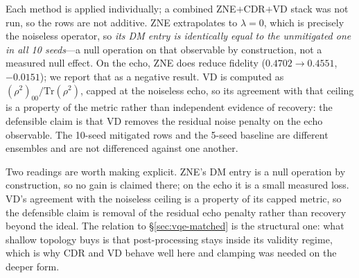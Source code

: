 \documentclass[twocolumn,aps,prl,superscriptaddress,showkeys]{revtex4-2}
\theoremstyle{plain}
\theoremstyle{definition}
\newcommand{\fakefez}{\texttt{FakeFez}}
\begin{document}
\begin{table}[htbp]
\centering
\caption{8-qubit mitigation on \fakefez{} over a complete ten-seed ensemble, mean$\pm$s.d. ($\mathrm{ddof}=1$), no seed excluded. DM: density-matrix fidelity under the target noise model. Echo: inversion-test fidelity (target-echo), with the noiseless ceiling for the same circuit given for reference.}
\label{tab:stacking8q}
\vspace{2pt}
{\raggedright\scriptsize Each method is applied individually; a combined ZNE$+$CDR$+$VD stack was not run, so the rows are not additive. ZNE extrapolates to $\lambda=0$, which is precisely the noiseless operator, so \emph{its DM entry is identically equal to the unmitigated one in all 10 seeds}---a null operation on that observable by construction, not a measured null effect. On the echo, ZNE does reduce fidelity ($0.4702\to0.4551$, $-0.0151$); we report that as a negative result. VD is computed as $(\rho^2)_{00}/\mathrm{Tr}(\rho^2)$, capped at the noiseless echo, so its agreement with that ceiling is a property of the metric rather than independent evidence of recovery: the defensible claim is that VD removes the residual noise penalty on the echo observable. The 10-seed mitigated rows and the 5-seed baseline are different ensembles and are not differenced against one another.}
\end{table}

Two readings are worth making explicit. ZNE's DM entry is a null operation by construction, so no gain is claimed there; on the echo it is a small measured loss. VD's agreement with the noiseless ceiling is a property of its capped metric, so the defensible claim is removal of the residual echo penalty rather than recovery beyond the ideal. The relation to \S\ref{sec:vqe-matched} is the structural one: what shallow topology buys is that post-processing stays inside its validity regime, which is why CDR and VD behave well here and clamping was needed on the deeper form.
\end{document}
